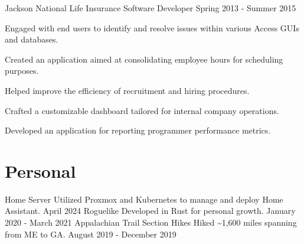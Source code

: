 \documentclass{marvinkassabian_resume}
\begin{document}
\subsectionpositiondate
{Jackson National Life Insurance}
{Software Developer}
{Spring 2013 - Summer 2015}
\resumesublistbegin
\item Engaged with end users to identify and resolve issues within various Access GUIs and databases.
\item Created an application aimed at consolidating employee hours for scheduling purposes.
\item Helped improve the efficiency of recruitment and hiring procedures.
\item Crafted a customizable dashboard tailored for internal company operations.
\item Developed an application for reporting programmer performance metrics.
\resumesublistend

\section{Personal}
\subsectionlocationdate
{Home Server}
{Utilized Proxmox and Kubernetes to manage and deploy Home Assistant.}
{April 2024}
\subsectionlocationdate
{Roguelike}
{Developed in Rust for personal growth.}
{January 2020 - March 2021}
\subsectionlocationdate
{Appalachian Trail Section Hikes}
{Hiked \~{}1,600 miles spanning from ME to GA.}
{August 2019 - December 2019}
\end{document}
